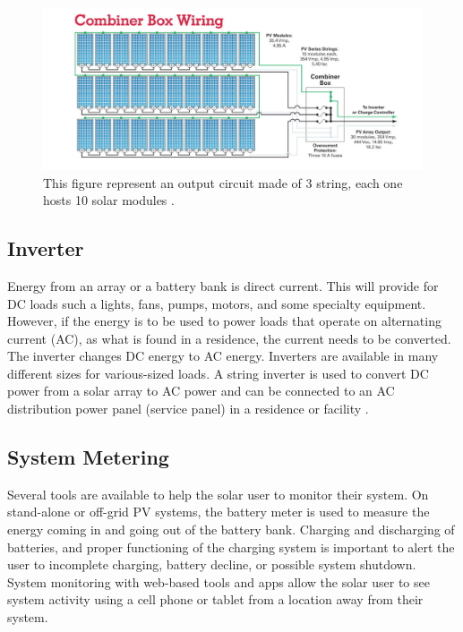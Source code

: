 \begin{figure}[H]
	\centering
	\includegraphics[width=\textwidth, keepaspectratio]{chapters/1_introduction/imgs/junctionbox.png}
	\caption{This figure represent an output circuit made of 3 string, each one hosts 10 solar modules \cite{pvarizona}.}
	\label{fig:outcircuit}
\end{figure}


\subsection{Inverter}
Energy from an array or a battery bank is direct current. This will provide for DC loads such a lights, fans,
pumps, motors, and some specialty equipment. However,
if the energy is to be used to power loads that operate on
alternating current (AC), as what is found in a residence, the
current needs to be converted. The inverter changes DC energy
to AC energy. Inverters are available in many different sizes
for various-sized loads.
A string inverter is used to convert DC power from a solar
array to AC power and can be connected to an AC distribution
power panel (service panel) in a residence or facility \cite{pvarizona}.


\subsection{System Metering}
Several tools are available to help the solar user to monitor
their system. On stand-alone or off-grid PV systems, the
battery meter is used to measure the energy coming in and
going out of the battery bank. Charging and discharging of
batteries, and proper functioning of the charging system is
important to alert the user to incomplete charging, battery
decline, or possible system shutdown\cite{pvarizona}. System monitoring
with web-based tools and apps allow the solar user to see
system activity using a cell phone or tablet from a location
away from their system.